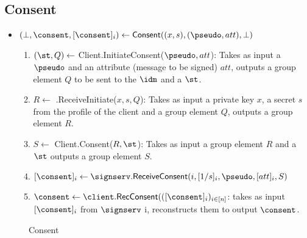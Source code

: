 \subsection{Consent}
\begin{itemize}
    \item $(\bot, \consent, [\consent]_i) \gets \mathsf{Consent}((x,s), (\pseudo, att), \bot)$
    \begin{enumerate}
    \item $(\st, Q) \gets$ \textsf{Client.InitiateConsent}($\pseudo, att$): Takes as input a $\pseudo$ and an attribute (message to be signed) $att$, outputs a group element $Q$ to be sent to the $\idm$ and a $\st$.
    
    \item $R \gets$ \textsf{\idm.ReceiveInitiate}($x, s, Q$): Takes as input a private key $x$, a secret $s$ from the profile of the client and a group element $Q$, outputs a group element $R$.
    \item $S \gets$ \textsf{Client.Consent}($R, \st$): Takes as input a group element $R$ and a $\st$ outputs a group element $S$.
    \item $[\consent]_i \gets \signserv.\mathsf{ReceiveConsent}(i, [1/s]_i, \pseudo, [att]_i, S)$ 
    \item $\consent \gets \client.\mathsf{RecConsent}(([\consent]_i)_{i \in [n]}$: takes as input $[\consent]_i$ from $\signserv$ i, reconstructs them to output $\consent$.
\end{enumerate}
\end{itemize}


\begin{figure*}[h!]
\caption{Consent}
\label{prot:consent}
\end{figure*}


